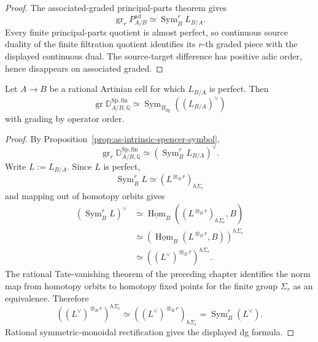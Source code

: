\begin{proof}
The associated-graded principal-parts theorem gives
\[
    \operatorname{gr}_rP_{A/B}^{\mathrm{ad}}
    \simeq
    \operatorname{Sym}_B^rL_{B/A}.
\]
Every finite principal-parts quotient is almost perfect, so continuous source
duality of the finite filtration quotient identifies its $r$-th graded
piece with the displayed continuous dual.  The source-target difference has
positive adic order, hence disappears on associated graded.
\end{proof}

\begin{theorem}
\label{thm:as-rational-spencer-symbol}
Let $A\to B$ be a rational Artinian cell for which
$L_{B/A}$ is perfect.  Then
\[
\boxed{
    \operatorname{gr}
    \mathbb D_{A/B,\mathbb Q}^{\mathrm{Sp,fin}}
    \simeq
    \operatorname{Sym}_{B_{\mathrm{dg}}}
    \left(
        (L_{B/A})^\vee
    \right)
}
\]
with grading by operator order.
\end{theorem}

\begin{proof}
By
Proposition~\ref{prop:as-intrinsic-spencer-symbol},
\[
    \operatorname{gr}_r
    \mathbb D_{A/B,\mathbb Q}^{\mathrm{Sp,fin}}
    \simeq
    \left(
        \operatorname{Sym}_B^rL_{B/A}
    \right)^\vee.
\]
Write $L:=L_{B/A}$.  Since $L$ is perfect,
\[
    \operatorname{Sym}_B^rL
    \simeq
    \left(L^{\otimes_B r}\right)_{h\Sigma_r}
\]
and mapping out of homotopy orbits gives
\[
\begin{aligned}
    \left(\operatorname{Sym}_B^rL\right)^\vee
    &\simeq
    \underline{\operatorname{Hom}}_B
    \left(
        \left(L^{\otimes_B r}\right)_{h\Sigma_r},
        B
    \right)\\
    &\simeq
    \left(
        \underline{\operatorname{Hom}}_B
        \left(L^{\otimes_B r},B\right)
    \right)^{h\Sigma_r}\\
    &\simeq
    \left(
        (L^\vee)^{\otimes_B r}
    \right)^{h\Sigma_r}.
\end{aligned}
\]
The rational Tate-vanishing theorem of the preceding chapter identifies the
norm map from homotopy orbits to homotopy fixed points for the finite group
$\Sigma_r$ as an equivalence.  Therefore
\[
    \left(
        (L^\vee)^{\otimes_B r}
    \right)^{h\Sigma_r}
    \simeq
    \left(
        (L^\vee)^{\otimes_B r}
    \right)_{h\Sigma_r}
    =
    \operatorname{Sym}_B^r(L^\vee).
\]
Rational symmetric-monoidal rectification gives the displayed dg formula.
\end{proof}

